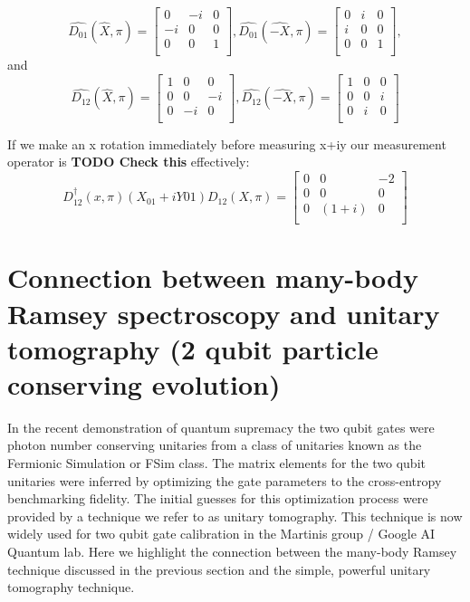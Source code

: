 {\begin{equation}
    \hat{D_{01}}(\hat{X}, \pi)=
    \begin{bmatrix}
        0  & -i & 0 \\
        -i & 0 & 0 \\
        0  & 0 & 1 \\
    \end{bmatrix},
    \hat{D_{01}}(\hat{-X}, \pi)=
    \begin{bmatrix}
        0  & i & 0 \\
        i & 0 & 0 \\
        0  & 0 & 1 \\
    \end{bmatrix},
\end{equation}
and
\begin{equation}
    \hat{D_{12}}(\hat{X}, \pi)=
    \begin{bmatrix}
        1 & 0 & 0 \\
        0 & 0 & -i \\
        0 & -i & 0 \\
    \end{bmatrix},
    \hat{D_{12}}(\hat{-X}, \pi)=
    \begin{bmatrix}
        1 & 0 & 0 \\
        0 & 0 & i \\
        0 & i & 0 \\
    \end{bmatrix}
\end{equation}

If we make an x rotation immediately before measuring x+iy our measurement operator is \textbf{TODO Check this} effectively:
\begin{equation}
    D_{12}^{\dagger}(x,\pi)(X_{01}+iY{01})D_{12}(X,\pi) =
    \begin{bmatrix}
        0 & 0 & -2 \\
        0 & 0 & 0 \\
        0 & (1+i) & 0 \\
    \end{bmatrix}
\end{equation}
} %

\section{ Connection between many-body Ramsey spectroscopy and unitary tomography (2 qubit particle conserving evolution)}
In the recent demonstration of quantum supremacy \cite{Arute2019} the two qubit gates were photon number conserving unitaries from a class of unitaries
known as the Fermionic Simulation or FSim class\cite{Kivlichan2018}.
The matrix elements for the two qubit unitaries were inferred by optimizing the gate parameters to the cross-entropy benchmarking fidelity.
The initial guesses for this optimization process were provided by a technique we refer to as unitary tomography.
This technique is now widely used for two qubit gate calibration in the Martinis group / Google AI Quantum lab.
Here we highlight the connection between the many-body Ramsey technique discussed in the previous section and the simple, powerful unitary tomography technique.

